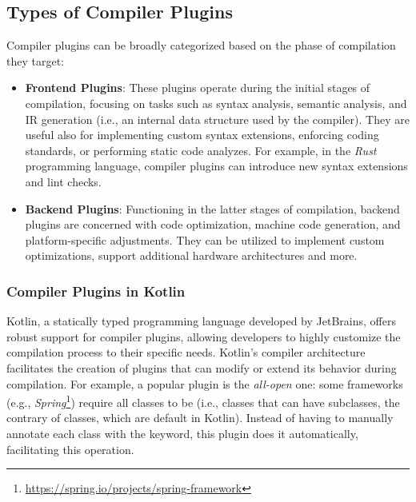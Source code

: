 \documentclass[12pt,a4paper,openright,twoside]{book}
\begin{document}
\subsection{Types of Compiler Plugins}

Compiler plugins can be broadly categorized based on the phase of compilation they target:

\begin{itemize}
  \item \textbf{Frontend Plugins}: These plugins operate during the initial
  stages of compilation, focusing on tasks such as syntax analysis, semantic
  analysis, and \ac{IR} generation (i.e., an internal data structure used by the
  compiler). They are useful also for implementing custom syntax extensions,
  enforcing coding standards, or performing static code analyzes. For example,
  in the \emph{Rust} programming language, compiler plugins can introduce new
  syntax extensions and lint checks. 

  \item \textbf{Backend Plugins}: Functioning in the latter stages of
  compilation, backend plugins are concerned with code optimization, machine
  code generation, and platform-specific adjustments. They can be utilized to
  implement custom optimizations, support additional hardware
  architectures and more.
\end{itemize}

\subsubsection{Compiler Plugins in Kotlin}

Kotlin, a statically typed programming language developed by JetBrains, offers
robust support for compiler plugins, allowing developers to highly customize the
compilation process to their specific needs. 
%
Kotlin's compiler architecture facilitates the creation of plugins that can
modify or extend its behavior during compilation. For example, a popular plugin
is the \emph{all-open} one: some frameworks (e.g.,
\emph{Spring}\footnote{\url{https://spring.io/projects/spring-framework}})
require all classes to be  (i.e., classes that can have subclasses,
the contrary of  classes, which are default in Kotlin). Instead of
having to manually annotate each class with the  keyword, this plugin
does it automatically, facilitating this operation.
\end{document}
